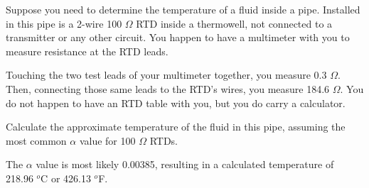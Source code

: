 

Suppose you need to determine the temperature of a fluid inside a pipe.  Installed in this pipe is a 2-wire 100 $\Omega$ RTD inside a thermowell, not connected to a transmitter or any other circuit.  You happen to have a multimeter with you to measure resistance at the RTD leads.

Touching the two test leads of your multimeter together, you measure 0.3 $\Omega$.  Then, connecting those same leads to the RTD's wires, you measure 184.6 $\Omega$.  You do not happen to have an RTD table with you, but you do carry a calculator.

Calculate the approximate temperature of the fluid in this pipe, assuming the most common $\alpha$ value for 100 $\Omega$ RTDs.







The $\alpha$ value is most likely 0.00385, resulting in a calculated temperature of 218.96 $^{o}$C or 426.13 $^{o}$F.











